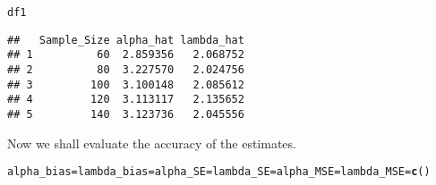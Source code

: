 \documentclass[11pt, a4paper]{article}\usepackage[]{graphicx}\usepackage[]{xcolor}
\makeatletter
\newcommand{\hldef}[1]{\textcolor[rgb]{0.345,0.345,0.345}{#1}}%
\newcommand{\hlkwb}[1]{\textcolor[rgb]{0.69,0.353,0.396}{#1}}%
\newcommand{\hlkwd}[1]{\textcolor[rgb]{0.737,0.353,0.396}{\textbf{#1}}}%
\newenvironment{kframe}{%
 \def\at@end@of@kframe{}%
 \ifinner\ifhmode%
  \def\at@end@of@kframe{\end{minipage}}%
  \begin{minipage}{\columnwidth}%
 \fi\fi%
 \def\FrameCommand##1{\hskip\@totalleftmargin \hskip-\fboxsep
 \colorbox{shadecolor}{##1}\hskip-\fboxsep
     \hskip-\linewidth \hskip-\@totalleftmargin \hskip\columnwidth}%
 \MakeFramed {\advance\hsize-\width
   \@totalleftmargin\z@ \linewidth\hsize
   \@setminipage}}%
 {\par\unskip\endMakeFramed%
 \at@end@of@kframe}
\newenvironment{knitrout}{}{} %
\makeatother
\begin{document}

\begin{knitrout}
\color{fgcolor}\begin{kframe}
\begin{alltt}
\hldef{df1}
\end{alltt}
\begin{verbatim}
##   Sample_Size alpha_hat lambda_hat
## 1          60  2.859356   2.068752
## 2          80  3.227570   2.024756
## 3         100  3.100148   2.085612
## 4         120  3.113117   2.135652
## 5         140  3.123736   2.045556
\end{verbatim}
\end{kframe}
\end{knitrout}

Now we shall evaluate the accuracy of the estimates.

\begin{knitrout}
\color{fgcolor}\begin{kframe}
\begin{alltt}
\hldef{alpha_bias} \hlkwb{=} \hldef{lambda_bias} \hlkwb{=} \hldef{alpha_SE} \hlkwb{=} \hldef{lambda_SE} \hlkwb{=} \hldef{alpha_MSE} \hlkwb{=} \hldef{lambda_MSE} \hlkwb{=} \hlkwd{c}\hldef{()}
\end{alltt}
\end{kframe}
\end{knitrout}
\end{document}
